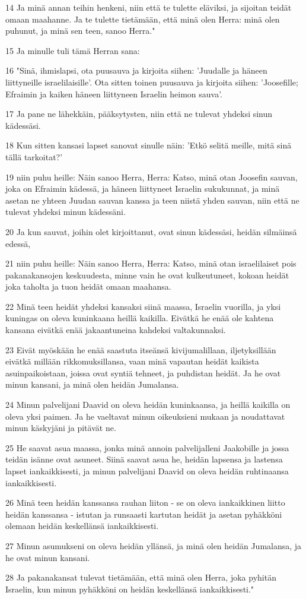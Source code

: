 \par 14 Ja minä annan teihin henkeni, niin että te tulette eläviksi, ja sijoitan teidät omaan maahanne. Ja te tulette tietämään, että minä olen Herra: minä olen puhunut, ja minä sen teen, sanoo Herra."
\par 15 Ja minulle tuli tämä Herran sana:
\par 16 "Sinä, ihmislapsi, ota puusauva ja kirjoita siihen: 'Juudalle ja häneen liittyneille israelilaisille'. Ota sitten toinen puusauva ja kirjoita siihen: 'Joosefille; Efraimin ja kaiken häneen liittyneen Israelin heimon sauva'.
\par 17 Ja pane ne lähekkäin, pääksytysten, niin että ne tulevat yhdeksi sinun kädessäsi.
\par 18 Kun sitten kansasi lapset sanovat sinulle näin: 'Etkö selitä meille, mitä sinä tällä tarkoitat?'
\par 19 niin puhu heille: Näin sanoo Herra, Herra: Katso, minä otan Joosefin sauvan, joka on Efraimin kädessä, ja häneen liittyneet Israelin sukukunnat, ja minä asetan ne yhteen Juudan sauvan kanssa ja teen niistä yhden sauvan, niin että ne tulevat yhdeksi minun kädessäni.
\par 20 Ja kun sauvat, joihin olet kirjoittanut, ovat sinun kädessäsi, heidän silmäinsä edessä,
\par 21 niin puhu heille: Näin sanoo Herra, Herra: Katso, minä otan israelilaiset pois pakanakansojen keskuudesta, minne vain he ovat kulkeutuneet, kokoan heidät joka taholta ja tuon heidät omaan maahansa.
\par 22 Minä teen heidät yhdeksi kansaksi siinä maassa, Israelin vuorilla, ja yksi kuningas on oleva kuninkaana heillä kaikilla. Eivätkä he enää ole kahtena kansana eivätkä enää jakaantuneina kahdeksi valtakunnaksi.
\par 23 Eivät myöskään he enää saastuta itseänsä kivijumalillaan, iljetyksillään eivätkä millään rikkomuksillansa, vaan minä vapautan heidät kaikista asuinpaikoistaan, joissa ovat syntiä tehneet, ja puhdistan heidät. Ja he ovat minun kansani, ja minä olen heidän Jumalansa.
\par 24 Minun palvelijani Daavid on oleva heidän kuninkaansa, ja heillä kaikilla on oleva yksi paimen. Ja he vaeltavat minun oikeuksieni mukaan ja noudattavat minun käskyjäni ja pitävät ne.
\par 25 He saavat asua maassa, jonka minä annoin palvelijalleni Jaakobille ja jossa teidän isänne ovat asuneet. Siinä saavat asua he, heidän lapsensa ja lastensa lapset iankaikkisesti, ja minun palvelijani Daavid on oleva heidän ruhtinaansa iankaikkisesti.
\par 26 Minä teen heidän kanssansa rauhan liiton - se on oleva iankaikkinen liitto heidän kanssansa - istutan ja runsaasti kartutan heidät ja asetan pyhäkköni olemaan heidän keskellänsä iankaikkisesti.
\par 27 Minun asumukseni on oleva heidän yllänsä, ja minä olen heidän Jumalansa, ja he ovat minun kansani.
\par 28 Ja pakanakansat tulevat tietämään, että minä olen Herra, joka pyhitän Israelin, kun minun pyhäkköni on heidän keskellänsä iankaikkisesti."

